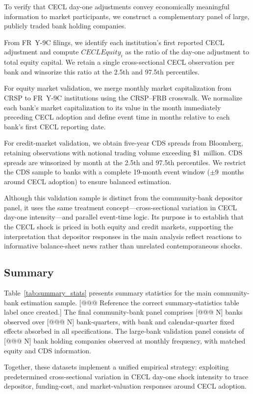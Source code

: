 To verify that CECL day-one adjustments convey economically meaningful information to market participants, we construct a complementary panel of large, publicly traded bank holding companies.

From FR~Y-9C filings, we identify each institution's first reported CECL adjustment and compute $CECLEquity_i$ as the ratio of the day-one adjustment to total equity capital. We retain a single cross-sectional CECL observation per bank and winsorize this ratio at the 2.5th and 97.5th percentiles.

For equity market validation, we merge monthly market capitalization from CRSP to FR~Y-9C institutions using the CRSP--FRB crosswalk. We normalize each bank's market capitalization to its value in the month immediately preceding CECL adoption and define event time in months relative to each bank's first CECL reporting date.

For credit-market validation, we obtain five-year CDS spreads from Bloomberg, retaining observations with notional trading volume exceeding \$1~million. CDS spreads are winsorized by month at the 2.5th and 97.5th percentiles. We restrict the CDS sample to banks with a complete 19-month event window ($\pm 9$~months around CECL adoption) to ensure balanced estimation.

Although this validation sample is distinct from the community-bank depositor panel, it uses the same treatment concept---cross-sectional variation in CECL day-one intensity---and parallel event-time logic. Its purpose is to establish that the CECL shock is priced in both equity and credit markets, supporting the interpretation that depositor responses in the main analysis reflect reactions to informative balance-sheet news rather than unrelated contemporaneous shocks.

\subsection{Summary}

Table~\ref{tab:summary_stats} presents summary statistics for the main community-bank estimation sample. [@@@ Reference the correct summary-statistics table label once created.] The final community-bank panel comprises [@@@ N] banks observed over [@@@ N] bank-quarters, with bank and calendar-quarter fixed effects absorbed in all specifications. The large-bank validation panel consists of [@@@ N] bank holding companies observed at monthly frequency, with matched equity and CDS information.

Together, these datasets implement a unified empirical strategy: exploiting predetermined cross-sectional variation in CECL day-one shock intensity to trace depositor, funding-cost, and market-valuation responses around CECL adoption.
